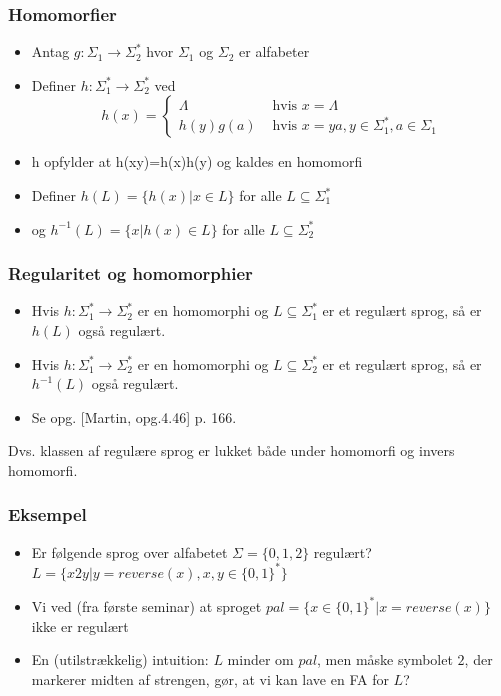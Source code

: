 \begin{frame}
\frametitle{Homomorfier}
\begin{itemize}[<+->]
\item Antag $g: \Sigma_1 \rightarrow \Sigma_2^*$ hvor $\Sigma_1$ og
  $\Sigma_2$ er alfabeter
\item  Definer  $h: \Sigma_1^* \rightarrow \Sigma_2^*$ ved 
   \[
   h(x) = \begin{cases}\Lambda &\text{ hvis }x=\Lambda \\
     h(y)g(a)  & \text{ hvis }x=ya, y\in\Sigma_1^*, a\in\Sigma_1
\end{cases}
   \]
\item  h opfylder at h(xy)=h(x)h(y) og kaldes en  
\alert{homomorfi}
\item  Definer  $h(L) = \{ h(x) | x\in L \}$  for alle $L\subseteq\Sigma_1^*$
\item  og $h^{-1}(L) = \{ x | h(x)\in L \}$  for alle $L\subseteq\Sigma_2^*$ 
\end{itemize}
\end{frame}

\begin{frame}
\frametitle{Regularitet og homomorphier}
\begin{itemize}[<+->]
\item Hvis $h: \Sigma_1^* \rightarrow \Sigma_2^*$ er en homomorphi og
  $L\subseteq \Sigma_1^*$ er et regulært sprog, så er $h(L)$ også regulært.
\item Hvis $h: \Sigma_1^* \rightarrow \Sigma_2^*$ er en homomorphi og
  $L\subseteq \Sigma_2^*$ er et regulært sprog, så er $h^{-1}(L)$ også regulært.
\item Se opg. [Martin, opg.4.46] p. 166.
\end{itemize}
Dvs. klassen af regulære sprog er lukket både under homomorfi og
invers homomorfi.
\end{frame}

\begin{frame}
\frametitle{Eksempel}
\begin{itemize}[<+->]
\item Er følgende sprog over alfabetet $\Sigma=\{0,1,2\}$ regulært?  
   $L = \{ x2y | y=reverse(x), x,y\in\{0,1\}^* \}$ 
\item  Vi ved (fra første seminar) at sproget  
   $pal = \{ x\in\{0,1\}^* | x=reverse(x) \}$  
ikke er regulært 
\item  En (utilstrækkelig) intuition: 
$L$ minder om $pal$, men måske symbolet $2$, der markerer  
midten af strengen, gør, at vi kan lave en FA for $L$?
\end{itemize}
\end{frame}

